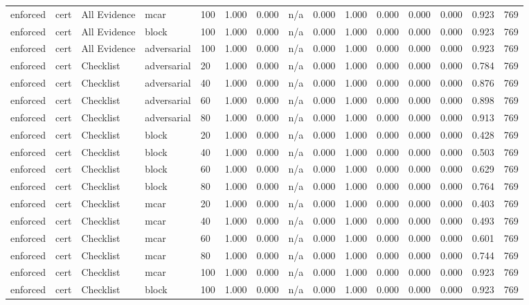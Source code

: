 \begin{table}[!ht]
{\begin{tabular}{lllllllllllllll}
enforced & cert & All Evidence & mcar & 100 & 1.000 & 0.000 & n/a & 0.000 & 1.000 & 0.000 & 0.000 & 0.000 & 0.923 & 769 \\
enforced & cert & All Evidence & block & 100 & 1.000 & 0.000 & n/a & 0.000 & 1.000 & 0.000 & 0.000 & 0.000 & 0.923 & 769 \\
enforced & cert & All Evidence & adversarial & 100 & 1.000 & 0.000 & n/a & 0.000 & 1.000 & 0.000 & 0.000 & 0.000 & 0.923 & 769 \\
enforced & cert & Checklist & adversarial & 20 & 1.000 & 0.000 & n/a & 0.000 & 1.000 & 0.000 & 0.000 & 0.000 & 0.784 & 769 \\
enforced & cert & Checklist & adversarial & 40 & 1.000 & 0.000 & n/a & 0.000 & 1.000 & 0.000 & 0.000 & 0.000 & 0.876 & 769 \\
enforced & cert & Checklist & adversarial & 60 & 1.000 & 0.000 & n/a & 0.000 & 1.000 & 0.000 & 0.000 & 0.000 & 0.898 & 769 \\
enforced & cert & Checklist & adversarial & 80 & 1.000 & 0.000 & n/a & 0.000 & 1.000 & 0.000 & 0.000 & 0.000 & 0.913 & 769 \\
enforced & cert & Checklist & block & 20 & 1.000 & 0.000 & n/a & 0.000 & 1.000 & 0.000 & 0.000 & 0.000 & 0.428 & 769 \\
enforced & cert & Checklist & block & 40 & 1.000 & 0.000 & n/a & 0.000 & 1.000 & 0.000 & 0.000 & 0.000 & 0.503 & 769 \\
enforced & cert & Checklist & block & 60 & 1.000 & 0.000 & n/a & 0.000 & 1.000 & 0.000 & 0.000 & 0.000 & 0.629 & 769 \\
enforced & cert & Checklist & block & 80 & 1.000 & 0.000 & n/a & 0.000 & 1.000 & 0.000 & 0.000 & 0.000 & 0.764 & 769 \\
enforced & cert & Checklist & mcar & 20 & 1.000 & 0.000 & n/a & 0.000 & 1.000 & 0.000 & 0.000 & 0.000 & 0.403 & 769 \\
enforced & cert & Checklist & mcar & 40 & 1.000 & 0.000 & n/a & 0.000 & 1.000 & 0.000 & 0.000 & 0.000 & 0.493 & 769 \\
enforced & cert & Checklist & mcar & 60 & 1.000 & 0.000 & n/a & 0.000 & 1.000 & 0.000 & 0.000 & 0.000 & 0.601 & 769 \\
enforced & cert & Checklist & mcar & 80 & 1.000 & 0.000 & n/a & 0.000 & 1.000 & 0.000 & 0.000 & 0.000 & 0.744 & 769 \\
enforced & cert & Checklist & mcar & 100 & 1.000 & 0.000 & n/a & 0.000 & 1.000 & 0.000 & 0.000 & 0.000 & 0.923 & 769 \\
enforced & cert & Checklist & block & 100 & 1.000 & 0.000 & n/a & 0.000 & 1.000 & 0.000 & 0.000 & 0.000 & 0.923 & 769 \\

\end{tabular}}
\end{table}
